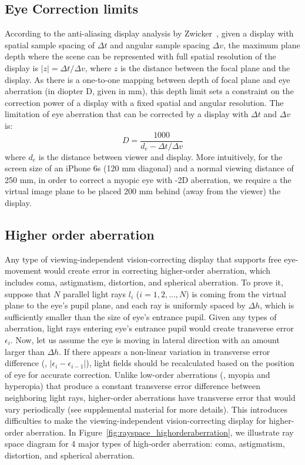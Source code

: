 \subsection{Eye Correction limits}
According to the anti-aliasing display analysis by Zwicker\etal~\cite{zwicker2006antialiasing}, given a display with spatial sample spacing of $\Delta t$ and angular sample spacing $\Delta v$, the maximum plane depth where the scene can be represented with full spatial resolution of the display is $|z| = \Delta t / \Delta v$, where $z$ is the distance between the focal plane and the display. As there is a one-to-one mapping between depth of focal plane and eye aberration (in diopter D, given in mm), this depth limit sets a constraint on the correction power of a display with a fixed spatial and angular resolution. The limitation of eye aberration that can be corrected by a display with $\Delta t$ and $\Delta v$ is:
$$D = \frac{1000}{d_e-\Delta t / \Delta v}$$
where $d_e$ is the distance between viewer and display. More intuitively, for the screen size of an iPhone 6s (120 mm diagonal) and a normal viewing distance of 250 mm, in order to correct a myopic eye with -2D aberration, we require a the virtual image plane to be placed 200 mm behind (away from the viewer) the display.

\subsection{Higher order aberration} \label{ss:Higherorderaberration}
Any type of viewing-independent vision-correcting display that supports free eye-movement would create error in correcting higher-order aberration, which includes coma, astigmatism, distortion, and spherical aberration. To prove it, suppose that $N$ parallel light rays $l_i$ ($i=1,2,...,N$) is coming from the virtual plane to the eye's pupil plane, and each ray is uniformly spaced by $\Delta h$, which is sufficiently smaller than the size of eye's entrance pupil. Given any types of aberration, light rays entering eye's entrance pupil would create transverse error $\epsilon_i$. Now, let us assume the eye is moving in lateral direction with an amount larger than $\Delta h$. If there appears a non-linear variation in transverse error difference (\ie, $|\epsilon_i -\epsilon_{i-1}|$), light fields should be recalculated based on the position of eye for accurate correction. Unlike low-order aberrations (\ie, myopia and hyperopia) that produce a constant transverse error difference between neighboring light rays, higher-order aberrations have transverse error that would vary periodically (see supplemental material for more details). This introduces difficulties to make the viewing-independent vision-correcting display for higher-order aberration. In Figure~\ref{fig:rayspace_highorderaberration}, we illustrate ray space diagram for 4 major types of high-order aberration: coma, astigmatism, distortion, and spherical aberration. 

